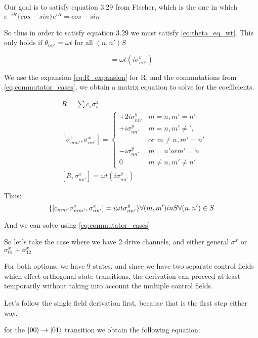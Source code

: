 \documentclass[12pt]{article}
\begin{document}
Our goal is to satisfy equation 3.29 from Fischer, which is the one in which
$e^{-iR} \{cos - sin\} e^{iR} = cos - sin$

So thus in order to satisfy equation 3.29 we must satisfy
\eqref{eq:theta_eq_wt}. 
This only holds if $\theta_{nn'} = \omega t$ for all
$(n,n') S$

\begin{equation}
    [R, \sigma^x_{nn'}] = \omega t (i \sigma^y_{nn'})
\end{equation}


We use the expansion \eqref{eq:R_expansion} for R, and the commutations from
\eqref{eq:commutator_cases}, we obtain a matrix equation to solve for the
coefficients.

\begin{align}
    & R = \sum c_s \sigma^z_s \label{eq:R_expansion}\\
    & [\sigma^z_{mm'}, \sigma^x_{nn'}] = 
    \begin{cases}
        +2 i \sigma^y_{nn'} & m=n, m'=n' \\
        + i \sigma^y_{nn'} & m=n, m' \neq ',\\
        & \text{or } m \neq n, m'=n'\\
        - i \sigma^y_{nn'} & m=n' or m'=n \\
        0 & m \neq n, m' \neq n'
    \end{cases}\\
    & [R, \sigma^x_{nn'}] = \omega t (i \sigma^y_{nn'})
\end{align}

Thus:
\begin{equation}
    \qty{[c_{mm'} \sigma^z_{mm'}, \sigma^x_{nn'}] = i \omega t \sigma^y_{nn'}} \forall (m,m') in S \forall (n,n') \in S
\end{equation}

And we can solve using \eqref{eq:commutator_cases}

So let's take the case where we have 2 drive channels, and either general $\sigma^x$ or $\sigma^x_{01} + \sigma^x_{12}$

For both options, we have 9 states, and since we have two separate control
 fields which effect orthogonal state transitions, the derivation can proceed at
 least temporarily without taking into account the multiple control fields.

Let's follow the single field derivation first, because that is the first step either way.

for the $\ket{00}\rightarrow \ket{01}$ transition we obtain the following equation:
\end{document}
